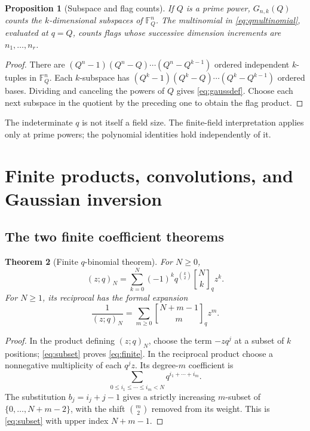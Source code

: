 \documentclass[11pt,a4paper]{article}
\numberwithin{equation}{section}
\newtheorem{theorem}{Theorem}[section]
\newtheorem{proposition}[theorem]{Proposition}
\theoremstyle{definition}
\theoremstyle{remark}
\newcommand{\G}[2]{\genfrac{[}{]}{0pt}{}{#1}{#2}_{q}}
\newcommand{\qp}[2]{(#1;q)_{#2}}
\begin{document}
\begin{proposition}[Subspace and flag counts]
\label{prop:flags}
If $Q$ is a prime power, $G_{n,k}(Q)$ counts the $k$-dimensional
subspaces of $\mathbb F_Q^n$. The multinomial in
\cref{eq:qmultinomial}, evaluated at $q=Q$, counts flags whose successive
dimension increments are $n_1,\ldots,n_r$.
\end{proposition}
\begin{proof}
There are $(Q^n-1)(Q^n-Q)\cdots(Q^n-Q^{k-1})$ ordered independent
$k$-tuples in $\mathbb F_Q^n$. Each $k$-subspace has
$(Q^k-1)(Q^k-Q)\cdots(Q^k-Q^{k-1})$ ordered bases. Dividing and canceling
the powers of $Q$ gives \cref{eq:gaussdef}. Choose each next subspace
in the quotient by the preceding one to obtain the flag product.
\end{proof}
The indeterminate $q$ is not itself a field size. The finite-field
interpretation applies only at prime powers; the polynomial identities
hold independently of it.

\section{Finite products, convolutions, and Gaussian inversion}
\label{sec:products}
\subsection{The two finite coefficient theorems}
\begin{theorem}[Finite $q$-binomial theorem]
\label{thm:finite}
For $N\ge0$,
\begin{equation}
 \qp zN=\sum_{k=0}^N(-1)^kq^{\binom k2}\G Nk z^k.
 \label{eq:finite}
\end{equation}
For $N\ge1$, its reciprocal has the formal expansion
\begin{equation}
 \frac1{\qp zN}=\sum_{m\ge0}\G{N+m-1}m z^m.
 \label{eq:finite-recip}
\end{equation}
\end{theorem}
\begin{proof}
In the product defining $\qp zN$, choose the term $-zq^j$ at a subset of
$k$ positions; \cref{eq:subset} proves \cref{eq:finite}.
In the reciprocal product choose a nonnegative multiplicity of each
$q^jz$. Its degree-$m$ coefficient is
\[
 \sum_{0\le i_1\le\cdots\le i_m<N}q^{i_1+\cdots+i_m}.
\]
The substitution $b_j=i_j+j-1$ gives a strictly increasing $m$-subset of
$\{0,\ldots,N+m-2\}$, with the shift $\binom m2$ removed from its weight.
This is \cref{eq:subset} with upper index $N+m-1$.
\end{proof}
\end{document}
